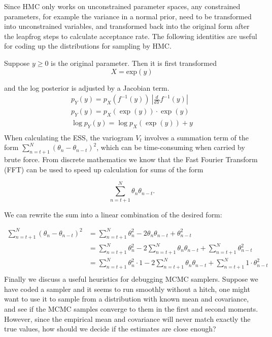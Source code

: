 \documentclass[12pt]{report}
\begin{document}
Since HMC only works on unconstrained parameter spaces, any constrained parameters, for example the variance in a normal prior, need to be transformed into unconstrained variables, and transformed back into the original form after the leapfrog steps to calculate acceptance rate. The following identities are useful for coding up the distributions for sampling by HMC.

Suppose $y \ge 0 $ is the original parameter. Then it is first transformed
 \[ X = \text{exp}(y)  \]
 
 and the log posterior is adjusted by a Jacobian term.
\begin{align*}
p_Y(y) = p_X(f^{-1}(y)) \ |\frac{d}{dY} f^{-1}(y) |\\
p_Y(y) = p_X(\exp(y)) \cdot \exp(y) \\
\log p_Y(y) = \log p_X(\exp(y)) + y \\
\end{align*}
When calculating the ESS, the variogram $V_t$ involves a summation term of the form $\sum_{n=t+1}^N (\theta_{n} - \theta_{n-t})^2$, which can be time-consuming when carried by brute force. From discrete mathematics we know that the Fast Fourier Transform (FFT) can be used to speed up calculation for sums of the form 

\[ \sum_{n=t+1}^N \theta_n \theta_{n-t}.  \]

We can rewrite the sum into a linear combination of the desired form:

\begin{align*}
 \sum_{n=t+1}^N (\theta_{n} - \theta_{n-t})^2 &= \sum_{n=t+1}^N \theta_n^2 - 2 \theta_n \theta_{n-t} + \theta_{n-t}^2  \\
 &= \sum_{n=t+1}^N \theta_n^2 -2 \sum_{n=t+1}^N \theta_n \theta_{n-t} + \sum_{n=t+1}^N \theta_{n-t}^2 \\ 
  &= \sum_{n=t+1}^N  \theta_n^2 \cdot 1  -2 \sum_{n=t+1}^N \theta_n \theta_{n-t} + \sum_{n=t+1}^N 1 \cdot \theta_{n-t}^2 \\
\end{align*}
Finally we discuss a useful heuristics for debugging MCMC samplers. Suppose we have coded a sampler and it seems to run smoothly without a hitch, one might want to use it to sample from a distribution with known mean and covariance, and see if the MCMC samples converge to them in the first and second moments. However, since the empirical mean and covariance will never match exactly the true values, how should we decide if the estimates are close enough?
\end{document}
